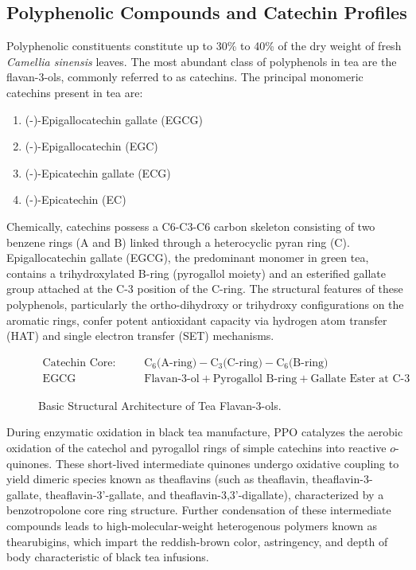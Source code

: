 \documentclass[11pt,a4paper]{article}
\begin{document}
\subsection{Polyphenolic Compounds and Catechin Profiles}
Polyphenolic constituents constitute up to 30\% to 40\% of the dry weight of fresh \textit{Camellia sinensis} leaves. The most abundant class of polyphenols in tea are the flavan-3-ols, commonly referred to as catechins. The principal monomeric catechins present in tea are:
\begin{enumerate}
    \item (-)-Epigallocatechin gallate (EGCG)
    \item (-)-Epigallocatechin (EGC)
    \item (-)-Epicatechin gallate (ECG)
    \item (-)-Epicatechin (EC)
\end{enumerate}

Chemically, catechins possess a C6-C3-C6 carbon skeleton consisting of two benzene rings (A and B) linked through a heterocyclic pyran ring (C). Epigallocatechin gallate (EGCG), the predominant monomer in green tea, contains a trihydroxylated B-ring (pyrogallol moiety) and an esterified gallate group attached at the C-3 position of the C-ring. The structural features of these polyphenols, particularly the ortho-dihydroxy or trihydroxy configurations on the aromatic rings, confer potent antioxidant capacity via hydrogen atom transfer (HAT) and single electron transfer (SET) mechanisms.

\begin{figure}[h!]
\centering
\begin{align*}
\text{Catechin Core: } &\text{C}_6\text{(A-ring)} - \text{C}_3\text{(C-ring)} - \text{C}_6\text{(B-ring)} \\
\text{EGCG Composition: } &\text{Flavan-3-ol} + \text{Pyrogallol B-ring} + \text{Gallate Ester at C-3}
\end{align*}
\caption{Basic Structural Architecture of Tea Flavan-3-ols.}
\end{figure}

During enzymatic oxidation in black tea manufacture, PPO catalyzes the aerobic oxidation of the catechol and pyrogallol rings of simple catechins into reactive $o$-quinones. These short-lived intermediate quinones undergo oxidative coupling to yield dimeric species known as theaflavins (such as theaflavin, theaflavin-3-gallate, theaflavin-3'-gallate, and theaflavin-3,3'-digallate), characterized by a benzotropolone core ring structure. Further condensation of these intermediate compounds leads to high-molecular-weight heterogenous polymers known as thearubigins, which impart the reddish-brown color, astringency, and depth of body characteristic of black tea infusions.
\end{document}
